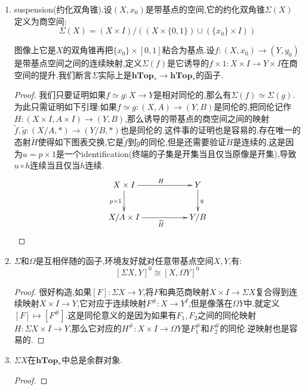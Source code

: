 \begin{enumerate}
\begin{proof}
    	接下来要验证群对象定义中的三个交换图表,以结合律为例,我们要构造$\mu(\mu\times1)$和$\mu(1\times\mu)$之间的同伦映射$G:\Omega(X)\times\Omega(X)\times\Omega(X)\times I\to\Omega(X)$.但是我们解释过由于$I$是紧Hausdorff空间,这等价于连续映射$F:\Omega(X)\times\Omega(X)\times\Omega(X)\times I\times I\to X$,但是这个构造和道路乘积的结合律是一样的.类似可以构造群对象定义中的$\eta$,以及验证另外两个同伦交换图表.
    \end{proof}
    \item suspension(约化双角锥).设$(X,x_0)$是带基点的空间,它的约化双角锥$\Sigma(X)$定义为商空间:
    $$\Sigma(X)=(X\times I)/((X\times\{0,1\})\cup(\{x_0\}\times I))$$
    
    图像上它是$X$的双角锥再把$\{x_0\}\times[0,1]$粘合为基点.设$f:(X,x_0)\to(Y,y_0)$是带基点空间之间的连续映射,定义$\Sigma(f)$是它诱导的$f\times1:X\times I\to Y\times I$在商空间的提升.我们断言$\Sigma$实际上是$\textbf{hTop}_*\to\textbf{hTop}_*$的函子.
    \begin{proof}
    	
    	我们只要证明如果$f\simeq g:X\to Y$是相对同伦的,那么有$\Sigma(f)\simeq\Sigma(g)$.为此只需证明如下引理:如果$f\simeq g:(X,A)\to(Y,B)$是同伦的,把同伦记作$H:(X\times I,A\times I)\to(Y,B)$,那么诱导的带基点的商空间之间的映射$\widetilde{f},\widetilde{g}:(X/A,\ast)\to(Y/B,\ast)$也是同伦的.这件事的证明也是容易的,存在唯一的态射$\widetilde{H}$使得如下图表交换,它是$\widetilde{f}$到$\widetilde{g}$的同伦,但是还需要验证$\widetilde{H}$是连续的,这是因为$u=p\times1$是一个identification(终端的子集是开集当且仅当原像是开集),导致$u\circ h$连续当且仅当$h$连续.
    	$$\xymatrix{X\times I\ar[rr]^H\ar[d]_{p\times1}&&Y\ar[d]^q\\X/A\times I\ar[rr]_{\widetilde{H}}&&Y/B}$$   	
    \end{proof}
    \item $\Sigma$和$\Omega$是互相伴随的函子,环境友好就对任意带基点空间$X,Y$,有:
    $$[\Sigma X,Y]^0\cong[X,\Omega Y]^0$$
    \begin{proof}
    	
    	很好构造,如果$[F]:\Sigma X\to Y$,将$F$和典范商映射$X\times I\to\Sigma X$复合得到连续映射$X\times I\to Y$,它对应于连续映射$F^{\#}:X\to Y^I$,但是像落在$\Omega Y$中.就定义$[F]\mapsto[F^{\#}]$.这是同伦意义的是因为如果有$F_1,F_2$之间的同伦映射$H:\Sigma X\times I\to Y$,那么它对应的$H^{\#}:X\times I\to\Omega Y$是$F_1^{\#}$和$F_2^{\#}$的同伦.逆映射也是容易的.
    \end{proof}
    \item $\Sigma X$在$\textbf{hTop}_*$中总是余群对象.
    \begin{proof}
    	

\end{proof}
\end{enumerate}
